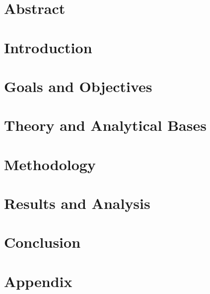 \documentclass[a4paper,11pt]{article}
\begin{document}
	
	\onecolumn
	\tableofcontents
	\pagebreak
	
	\twocolumn
	\section{Abstract}\label{sec:abstract}
	
	
	\section{Introduction}\label{sec:introduction}
	

	\section{Goals and Objectives}\label{sec:goals}
	
	
	\section{Theory and Analytical Bases}\label{sec:theory}
	

	\section{Methodology}\label{sec:methods}
	
	
	\section{Results and Analysis}\label{sec:results}
	

	\section{Conclusion}\label{sec:conclusion}
	

	\printbibliography
	
	\onecolumn
	\section{Appendix}\label{sec:appendix}
	
	
\end{document}
